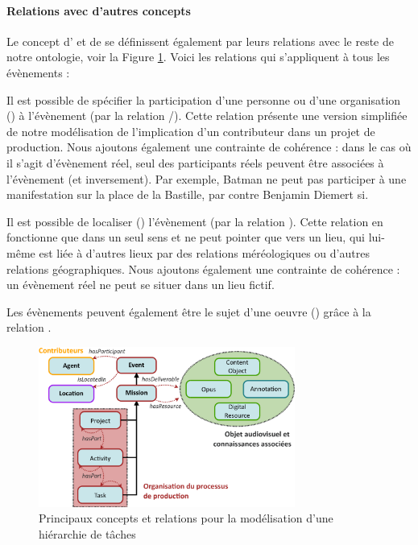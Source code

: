 \paragraph{Relations avec d'autres concepts}
Le concept d' et de  se définissent également par leurs relations avec le reste de notre ontologie, voir la Figure \ref{img:cr-event}. 
Voici les relations qui s'appliquent à tous les évènements : 
\begin{liste}
	\item Il est possible de spécifier la participation d'une personne ou d'une organisation () à l'évènement (par la relation /).
	Cette relation présente une version simplifiée de notre modélisation de l'implication d'un contributeur dans un projet de production.
	Nous ajoutons également une contrainte de cohérence : dans le cas où il s'agit d'évènement réel, seul des participants réels peuvent être associées à l'évènement (et inversement). 
	Par exemple, Batman ne peut pas participer à une manifestation sur la place de la Bastille, par contre Benjamin Diemert si. 

	\item Il est possible de localiser () l'évènement (par la relation ).
	Cette relation en fonctionne que dans un seul sens et ne peut pointer que vers un lieu, qui lui-même est liée à d'autres lieux par des relations méréologiques ou d'autres relations géographiques.
	Nous ajoutons également une contrainte de cohérence : un évènement réel ne peut se situer dans un lieu fictif.

	\item Les évènements peuvent également être le sujet d'une oeuvre () grâce à la relation . 
\end{liste}


\begin{figure}[ht!]
\centering
\includegraphics[width=0.75\textwidth]{./images/MOD-Process-v2.png}
\caption{Principaux concepts et relations pour la modélisation d'une hiérarchie de tâches}
\label{img:cr-event}
\end{figure}


